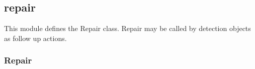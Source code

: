 \documentclass[letterpaper,10pt,english]{sphinxmanual}
\begin{document}
\subsection{repair}
\label{\detokenize{index:module-feast.DetectionModules.repair}}\label{\detokenize{index:repair}}
This module defines the Repair class. Repair may be called by detection objects as follow up actions.


\subsubsection{Repair}
\label{\detokenize{index:id1}}
\end{document}

